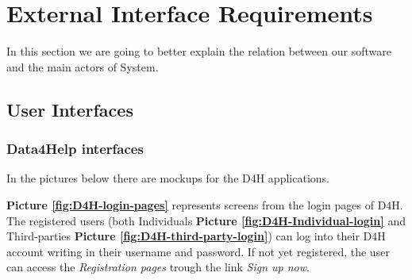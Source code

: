 \section{External Interface Requirements}

In this section we are going to better explain the relation between our software and the main actors of System.

\subsection{User Interfaces}

\subsubsection{Data4Help interfaces}
In the pictures below there are mockups for the D4H applications.

\textbf{Picture \ref{fig:D4H-login-pages}} represents screens from the login pages of D4H.  The registered users (both Individuals \textbf{Picture \ref{fig:D4H-Individual-login}} and Third-parties \textbf{Picture \ref{fig:D4H-third-party-login}}) can log into their D4H account writing in their username and password. If not yet registered, the user can access the \emph{Registration pages} trough the link \emph{Sign up now}.

